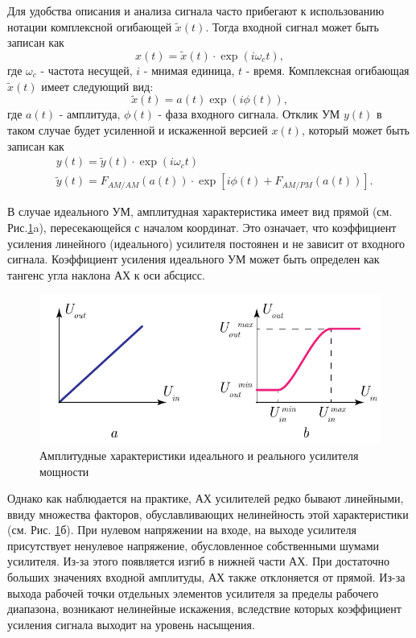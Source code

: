 Для удобства описания и анализа сигнала часто прибегают к использованию
нотации комплексной огибающей $\tilde{x}(t)$. Тогда входной сигнал может быть
записан как 
\begin{equation}
    x(t) = \tilde{x}(t) \cdot \exp(i \omega_c t),
\end{equation}
где $\omega_c$ - частота несущей, $i$ - мнимая единица, $t$ - время.
Комплексная огибающая $\tilde{x}(t)$ имеет следующий вид:
\begin{equation}
    \tilde{x}(t) = a(t) \exp(i\phi(t)),
\end{equation}
где $a(t)$ - амплитуда, $\phi(t)$ - фаза входного сигнала. Отклик УМ $y(t)$
в таком случае будет усиленной и искаженной версией $x(t)$, который может
быть записан как
\begin{equation}
    \begin{aligned}
        &y(t) = \tilde{y}(t) \cdot \exp(i \omega_c t)\\
        &\tilde{y}(t) = F_{AM/AM}(a(t)) \cdot \exp[i \phi(t) + F_{AM/PM}(a(t))].
    \end{aligned}
    \label{eq:pa_distortion}
\end{equation}

В случае идеального УМ, амплитудная характеристика имеет вид прямой (см.
Рис.\ref{fig:1.1}a), пересекающейся с началом координат. Это означает, что
коэффициент усиления линейного (идеального) усилителя постоянен и не
зависит от входного сигнала. Коэффициент усиления идеального УМ может быть
определен как тангенс угла наклона АХ к оси абсцисс.

\begin{figure}[h!]
    \centering
    \includegraphics[width=0.8\linewidth]{figs/amp_char.pdf}
    \caption{Амплитудные характеристики идеального и реального усилителя мощности}
    \label{fig:1.1}
\end{figure}

Однако как наблюдается на практике, АХ усилителей редко бывают линейными,
ввиду множества факторов, обуславливающих нелинейность этой характеристики
(см. Рис. \ref{fig:1.1}б). При нулевом напряжении на входе, на выходе
усилителя присутствует ненулевое напряжение, обусловленное собственными
шумами усилителя. Из-за этого появляется изгиб в нижней части АХ. При
достаточно больших значениях входной амплитуды, АХ также отклоняется от
прямой. Из-за выхода рабочей точки отдельных элементов усилителя за пределы
рабочего диапазона, возникают нелинейные искажения, вследствие которых
коэффициент усиления сигнала выходит на уровень насыщения.

